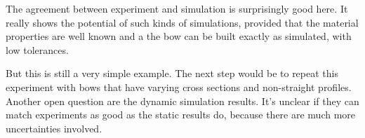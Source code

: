The agreement between experiment and simulation is surprisingly good here.
It really shows the potential of such kinds of simulations, provided that the material properties are well known and a the bow can be built exactly as simulated, with low tolerances.

But this is still a very simple example.
The next step would be to repeat this experiment with bows that have varying cross sections and non-straight profiles.
Another open question are the dynamic simulation results.
It's unclear if they can match experiments as good as the static results do, because there are much more uncertainties involved.
